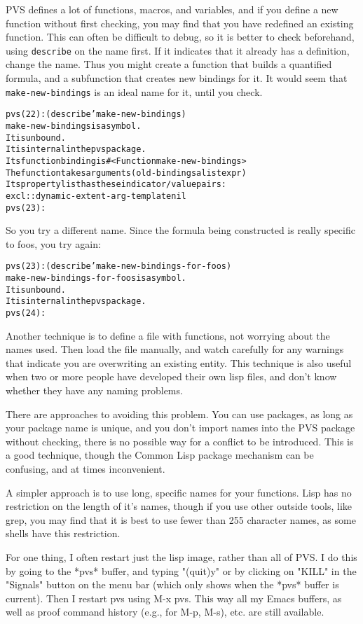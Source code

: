 \documentclass[12pt]{book}
\begin{document}
PVS defines a lot of functions, macros, and variables, and if you define a
new function without first checking, you may find that you have redefined
an existing function.  This can often be difficult to debug, so it is
better to check beforehand, using \texttt{describe} on the
name first.  If it indicates that it already has a definition, change the
name.  Thus you might create a function that builds a quantified formula,
and a subfunction that creates new bindings for it.  It would seem that
\texttt{make-new-bindings} is an ideal name for it, until you check.
\begin{alltt}
  pvs(22): (describe 'make-new-bindings)
  make-new-bindings is a symbol.
    It is unbound.
    It is internal in the pvs package.
    Its function binding is #<Function make-new-bindings>
      The function takes arguments (old-bindings alist expr)
    Its property list has these indicator/value pairs:
  excl::dynamic-extent-arg-template  nil
  pvs(23):
\end{alltt}
So you try a different name.  Since the formula being constructed is
really specific to foos, you try again:
\begin{alltt}
pvs(23): (describe 'make-new-bindings-for-foos)
  make-new-bindings-for-foos is a symbol.
    It is unbound.
    It is internal in the pvs package.
  pvs(24):
\end{alltt}

Another technique is to define a file with functions, not worrying about
the names used.  Then load the file manually, and watch carefully for any
warnings that indicate you are overwriting an existing entity.  This
technique is also useful when two or more people have developed their own
lisp files, and don't know whether they have any naming problems.

There are approaches to avoiding this problem.  You can use packages, as
long as your package name is unique, and you don't import names into the
PVS package without checking, there is no possible way for a conflict to
be introduced.  This is a good technique, though the Common Lisp package
mechanism can be confusing, and at times inconvenient.

A simpler approach is to use long, specific names for your functions.
Lisp has no restriction on the length of it's names, though if you use
other outside tools, like grep, you may find that it is best to use fewer
than 255 character names, as some shells have this restriction.


For one thing, I often restart just the lisp image, rather than all of
PVS.  I do this by going to the *pvs* buffer, and typing "(quit)y" or
by clicking on "KILL" in the "Signals" button on the menu bar (which
only shows when the *pvs* buffer is current).  Then I restart pvs
using M-x pvs.  This way all my Emacs buffers, as well as proof
command history (e.g., for M-p, M-s), etc. are still available.
\end{document}
